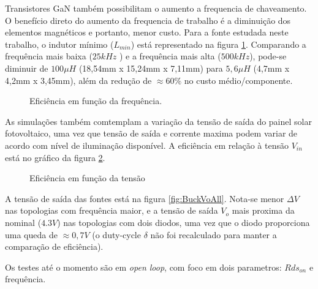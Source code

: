 \par Transistores GaN também possibilitam o aumento a frequencia de chaveamento. O benefício direto do aumento da frequencia de trabalho é a diminuição dos elementos magnéticos e portanto, menor custo. Para a fonte estudada neste trabalho, o indutor mínimo ($L_{min}$) está representado na figura \ref{GrafIndutorFrequencia}. Comparando a frequência mais baixa ($25kHz$ ) e a frequência mais alta ($500kHz$), pode-se diminuir de $100\mu  H$ (18,54mm x 15,24mm x 7,11mm) para $5,6\mu H$ (4,7mm x 4,2mm x 3,45mm), além da redução de $\approx 60\%$ no custo médio/componente.
\begin{center}
\begin{figure}[H]
\caption{Eficiência em função da frequência.}
\label{GrafIndutorFrequencia}
\end{figure}
\end{center}
\par As simulações também comtemplam a variação da tensão de saída do painel solar fotovoltaico, uma vez que tensão de saída e corrente maxima podem variar de acordo com nível de iluminação disponível. A eficiência em relação à tensão $V_{in}$ está no gráfico da figura \ref{GrafEficienciaTensao}. 
\begin{center}
\begin{figure}[H]
\caption{Eficiência em função da tensão}
\label{GrafEficienciaTensao}
\end{figure}
\end{center}
\par A tensão de saída das fontes está na figura \ref{fig:BuckVoAll}. Nota-se menor $\Delta V$ nas topologias com frequência maior, e a tensão de saída $V_o$ mais proxima da nominal ($4.3V$) nas topologias com dois diodos, uma vez que o diodo proporciona uma queda de $\approx 0,7V$ (o duty-cycle $\delta$ não foi recalculado para manter a comparação de eficiência). 
\par Os testes até o momento são em \textit{open loop}, com foco em dois parametros: $Rds_{on}$ e frequência.

